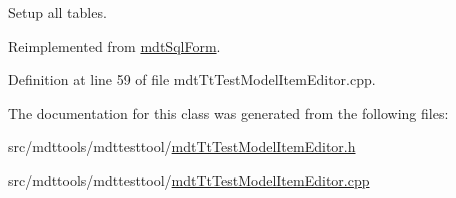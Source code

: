 Setup all tables. 



Reimplemented from \hyperlink{classmdt_sql_form_a27fe6e45aa5d4d7782aad9833e6de20b}{mdt\-Sql\-Form}.



Definition at line 59 of file mdt\-Tt\-Test\-Model\-Item\-Editor.\-cpp.



The documentation for this class was generated from the following files\-:\begin{DoxyCompactItemize}
\item 
src/mdttools/mdttesttool/\hyperlink{mdt_tt_test_model_item_editor_8h}{mdt\-Tt\-Test\-Model\-Item\-Editor.\-h}\item 
src/mdttools/mdttesttool/\hyperlink{mdt_tt_test_model_item_editor_8cpp}{mdt\-Tt\-Test\-Model\-Item\-Editor.\-cpp}\end{DoxyCompactItemize}

